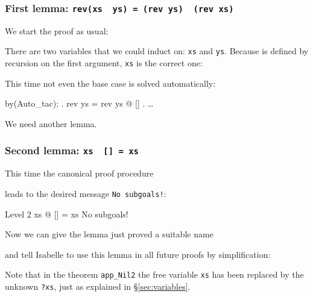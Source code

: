 \subsubsection*{First lemma: \texttt{rev(xs \at~ys) = (rev ys) \at~(rev xs)}}

We start the proof as usual:
\begin{ttbox}\makeatother
\end{ttbox}
There are two variables that we could induct on: \texttt{xs} and
\texttt{ys}. Because \texttt{\at} is defined by recursion on
the first argument, \texttt{xs} is the correct one:
\begin{ttbox}
\end{ttbox}
This time not even the base case is solved automatically:
\begin{ttbox}\makeatother
by(Auto_tac);
{. rev ys = rev ys @ []}
{. \dots}
\end{ttbox}
We need another lemma.

\subsubsection*{Second lemma: \texttt{xs \at~[] = xs}}

This time the canonical proof procedure
\begin{ttbox}\makeatother
\end{ttbox}
leads to the desired message \texttt{No subgoals!}:
\begin{ttbox}\makeatother
{\out Level 2}
{\out xs @ [] = xs}
{\out No subgoals!}
\end{ttbox}
Now we can give the lemma just proved a suitable name
\begin{ttbox}
\end{ttbox}
and tell Isabelle to use this lemma in all future proofs by simplification:
\begin{ttbox}
\end{ttbox}
Note that in the theorem \texttt{app_Nil2} the free variable \texttt{xs} has
been replaced by the unknown \texttt{?xs}, just as explained in
\S\ref{sec:variables}.

